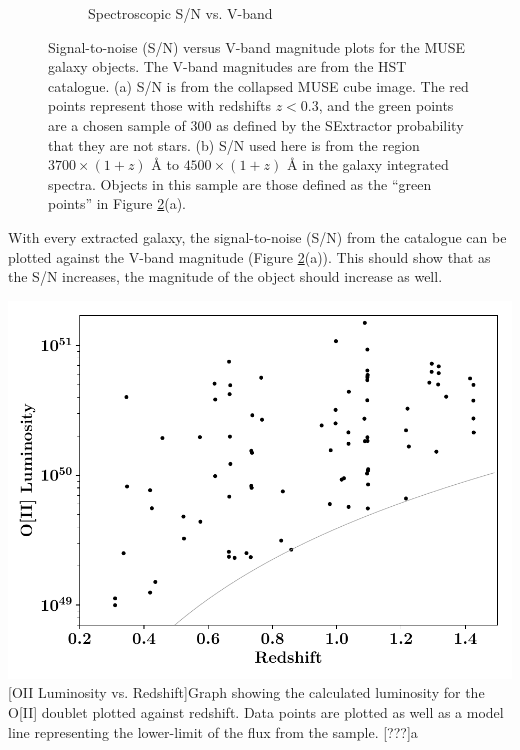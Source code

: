 \documentclass[12pt, twocolumn]{revtex4}    %
\begin{document}
\begin{figure}
\begin{subfigure}[b]{0.495\textwidth}
    \captionsetup{justification=justified}    
    \caption{Spectroscopic S/N vs. V-band}
    \label{fig:spec_sn_vband}
  \end{subfigure}
  \captionsetup{justification=justified}
  \caption[HUDF Objects]{Signal-to-noise (S/N) versus V-band magnitude plots for the MUSE galaxy objects. The V-band magnitudes are from the HST catalogue. (a) S/N is from the collapsed MUSE cube image. The red points represent those with redshifts $z<0.3$, and the green points are a chosen sample of 300 as defined by the SExtractor probability that they are not stars. (b) S/N used here is from the region $3700\times(1+z)$ {\AA} to $4500\times(1+z)$ {\AA} in the galaxy integrated spectra. Objects in this sample are those defined as the ``green points'' in Figure \ref{fig:sn_vband}(a).}
  \label{fig:sn_vband}
\end{figure}


With every extracted galaxy, the signal-to-noise (S/N) from the catalogue can be plotted against the V-band magnitude (Figure \ref{fig:sn_vband}(a)). This should show that as the S/N increases, the magnitude of the object should increase as well. 



\begin{center}
\includegraphics[width=1.0\linewidth]{data/o_ii_luminosity_vs_redshift}
[OII Luminosity vs. Redshift]{Graph showing the calculated luminosity for the O[II] doublet plotted against redshift. Data points are plotted as well as a model line representing the lower-limit of the flux from the sample. [???]a}
\label{fig:oiiluminosity_redshift}
\end{center}
\end{document}
